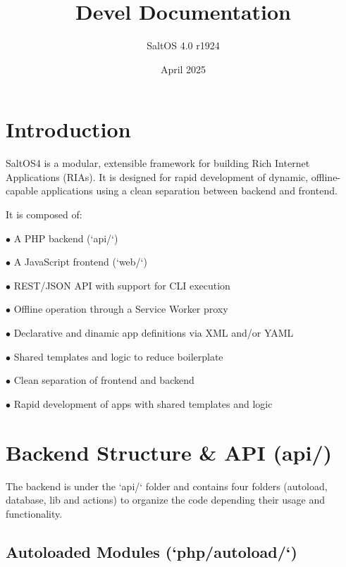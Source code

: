 \documentclass[a4paper]{article}
\title{Devel Documentation}
\author{SaltOS 4.0 r1924}
\begin{document}
\date{April 2025}
\maketitle
\clearpage

\tableofcontents
\clearpage


\hypertarget{toc1}{}
\section{Introduction}

SaltOS4 is a modular, extensible framework for building Rich Internet Applications (RIAs). It is designed for rapid development of dynamic, offline-capable applications using a clean separation between backend and frontend.

It is composed of:

\begin{compactitem}
\item[\color{myblue}$\bullet$] A PHP backend (`api/`)
\item[\color{myblue}$\bullet$] A JavaScript frontend (`web/`)
\item[\color{myblue}$\bullet$] REST/JSON API with support for CLI execution
\item[\color{myblue}$\bullet$] Offline operation through a Service Worker proxy
\item[\color{myblue}$\bullet$] Declarative and dinamic app definitions via XML and/or YAML
\item[\color{myblue}$\bullet$] Shared templates and logic to reduce boilerplate
\item[\color{myblue}$\bullet$] Clean separation of frontend and backend
\item[\color{myblue}$\bullet$] Rapid development of apps with shared templates and logic
\end{compactitem}


\hypertarget{toc2}{}
\section{Backend Structure \& API (api/)}

The backend is under the `api/` folder and contains four folders (autoload, database, lib and actions) to organize the code depending their usage and functionality.

\hypertarget{toc3}{}
\subsection{Autoloaded Modules (`php/autoload/`)}
\end{document}
